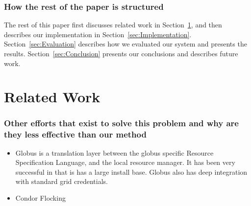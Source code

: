 \documentclass[11pt]{article}
\newcommand{\secref}[1]{Section~\ref{#1}}
\begin{document}
\subsubsection* {How the rest of the paper is structured}


The rest of this paper first discusses related work in
\secref{sec:RelatedWork}, and then describes our implementation in
\secref{sec:Implementation}. \secref{sec:Evaluation} describes how we evaluated
our system and presents the results. \secref{sec:Conclusion} presents our
conclusions and describes future work.


\section{Related Work}
\label{sec:RelatedWork}

\subsubsection*{Other efforts that exist to solve this problem and why are they
less effective than our method}

\begin{itemize}
\item
Globus is a translation layer between the globus specific Resource Specification Language, and the local resource manager.  It has been very successful in that is has a large install base.  Globus also has deep integration with standard grid credentials.

\item
Condor Flocking





\end{itemize}
\end{document}
